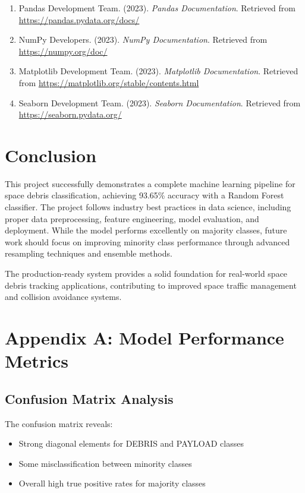 \documentclass[12pt,a4paper]{article}
\begin{document}
\begin{enumerate}
    \item Pandas Development Team. (2023). \textit{Pandas Documentation}. Retrieved from \url{https://pandas.pydata.org/docs/}
    
    \item NumPy Developers. (2023). \textit{NumPy Documentation}. Retrieved from \url{https://numpy.org/doc/}
    
    \item Matplotlib Development Team. (2023). \textit{Matplotlib Documentation}. Retrieved from \url{https://matplotlib.org/stable/contents.html}
    
    \item Seaborn Development Team. (2023). \textit{Seaborn Documentation}. Retrieved from \url{https://seaborn.pydata.org/}
\end{enumerate}

\section{Conclusion}

This project successfully demonstrates a complete machine learning pipeline for space debris classification, achieving 93.65\% accuracy with a Random Forest classifier. The project follows industry best practices in data science, including proper data preprocessing, feature engineering, model evaluation, and deployment. While the model performs excellently on majority classes, future work should focus on improving minority class performance through advanced resampling techniques and ensemble methods.

The production-ready system provides a solid foundation for real-world space debris tracking applications, contributing to improved space traffic management and collision avoidance systems.

\newpage
\section*{Appendix A: Model Performance Metrics}

\subsection*{Confusion Matrix Analysis}
The confusion matrix reveals:
\begin{itemize}
    \item Strong diagonal elements for DEBRIS and PAYLOAD classes
    \item Some misclassification between minority classes
    \item Overall high true positive rates for majority classes
\end{itemize}
\end{document}

